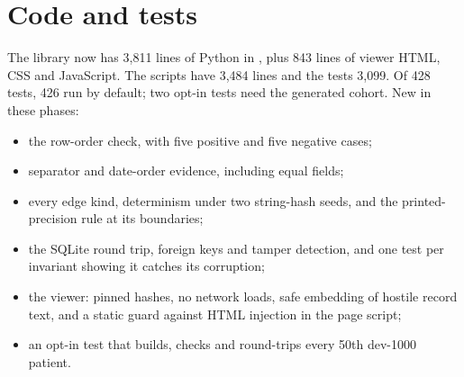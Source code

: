 \documentclass[11pt,a4paper]{article}
\newcommand{\code}[1]{\texttt{\detokenize{#1}}}
\begin{document}
\section{Code and tests}
The library now has 3,811 lines of Python in \code{src/medgraph}, plus 843 lines of viewer HTML, CSS and JavaScript. The scripts have 3,484 lines and the tests 3,099. Of 428 tests, 426 run by default; two opt-in tests need the generated cohort. New in these phases:
\begin{itemize}[nosep]
  \item the row-order check, with five positive and five negative cases;
  \item separator and date-order evidence, including equal fields;
  \item every edge kind, determinism under two string-hash seeds, and the printed-precision rule at its boundaries;
  \item the SQLite round trip, foreign keys and tamper detection, and one test per invariant showing it catches its corruption;
  \item the viewer: pinned hashes, no network loads, safe embedding of hostile record text, and a static guard against HTML injection in the page script;
  \item an opt-in test that builds, checks and round-trips every 50th dev-1000 patient.
\end{itemize}
\end{document}
